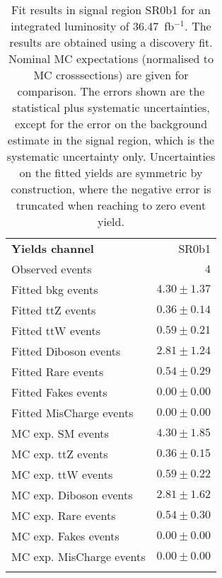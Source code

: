 

\begin{table}
\begin{center}
\setlength{\tabcolsep}{0.0pc}
{\small
\begin{tabular*}{\textwidth}{@{\extracolsep{\fill}}lr}
\noalign{\smallskip}\hline\noalign{\smallskip}
{\bfseries Yields channel}           & SR0b1              \\[-0.05cm]
\noalign{\smallskip}\hline\noalign{\smallskip}
Observed events          & $4$                    \\
\noalign{\smallskip}\hline\noalign{\smallskip}
Fitted bkg events         & $4.30 \pm 1.37$              \\
\noalign{\smallskip}\hline\noalign{\smallskip}
        Fitted ttZ events         & $0.36 \pm 0.14$              \\
        Fitted ttW events         & $0.59 \pm 0.21$              \\
        Fitted Diboson events         & $2.81 \pm 1.24$              \\
        Fitted Rare events         & $0.54 \pm 0.29$              \\
        Fitted Fakes events         & $0.00 \pm 0.00$              \\
        Fitted MisCharge events         & $0.00 \pm 0.00$              \\
 \noalign{\smallskip}\hline\noalign{\smallskip}
MC exp. SM events              & $4.30 \pm 1.85$              \\
\noalign{\smallskip}\hline\noalign{\smallskip}
        MC exp. ttZ events         & $0.36 \pm 0.15$              \\
        MC exp. ttW events         & $0.59 \pm 0.22$              \\
        MC exp. Diboson events         & $2.81 \pm 1.62$              \\
        MC exp. Rare events         & $0.54 \pm 0.30$              \\
        MC exp. Fakes events         & $0.00 \pm 0.00$              \\
        MC exp. MisCharge events         & $0.00 \pm 0.00$              \\
\noalign{\smallskip}\hline\noalign{\smallskip}
\end{tabular*}
}
\end{center}
\caption{Fit results in signal region SR0b1 for an integrated luminosity of 36.47~fb$^{-1}$.
The results are obtained using a discovery fit. Nominal MC expectations (normalised to MC crosssections) are given for comparison. 
The errors shown are the statistical plus systematic uncertainties, except for the error on the background estimate in the signal region, which is the systematic uncertainty only.
Uncertainties on the fitted yields are symmetric by construction, where the negative error is truncated when reaching to zero event yield.
}
\label{table.results.systematics.in.logL.fit..Yields.SR0b1}
\end{table}
\clearpage
%